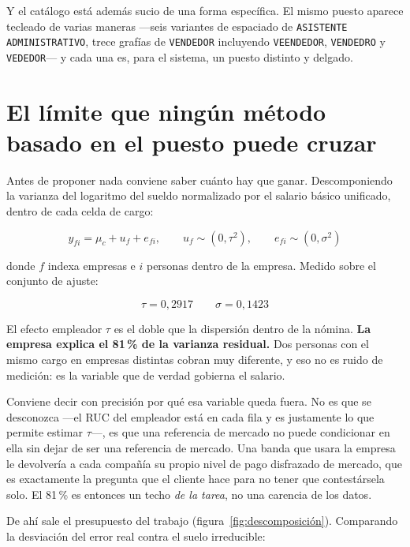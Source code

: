 \documentclass[12pt,a4paper]{report}
\newcommand{\cargo}[1]{\texttt{#1}}
\begin{document}
Y el catálogo está además sucio de una forma específica. El mismo puesto aparece
tecleado de varias maneras ---seis variantes de espaciado de \cargo{ASISTENTE
ADMINISTRATIVO}, trece grafías de \cargo{VENDEDOR} incluyendo \cargo{VEENDEDOR},
\cargo{VENDEDRO} y \cargo{VEDEDOR}--- y cada una es, para el sistema, un puesto
distinto y delgado.

\section{El límite que ningún método basado en el puesto puede cruzar}

Antes de proponer nada conviene saber cuánto hay que ganar. Descomponiendo la
varianza del logaritmo del sueldo normalizado por el salario básico unificado,
dentro de cada celda de cargo:

\begin{equation}
y_{fi} = \mu_c + u_f + e_{fi}, \qquad
u_f \sim (0, \tau^2), \qquad
e_{fi} \sim (0, \sigma^2)
\label{eq:modelo}
\end{equation}

donde $f$ indexa empresas e $i$ personas dentro de la empresa. Medido sobre el
conjunto de ajuste:

\[
\tau = 0{,}2917 \qquad \sigma = 0{,}1423
\]

El efecto empleador $\tau$ es el doble que la dispersión dentro de la nómina.
\textbf{La empresa explica el 81\,\% de la varianza residual.} Dos personas con
el mismo cargo en empresas distintas cobran muy diferente, y eso no es ruido de
medición: es la variable que de verdad gobierna el salario.

Conviene decir con precisión por qué esa variable queda fuera. No es que se
desconozca ---el RUC del empleador está en cada fila y es justamente lo que
permite estimar $\tau$---, es que una referencia de mercado no puede
condicionar en ella sin dejar de ser una referencia de mercado. Una banda que
usara la empresa le devolvería a cada compañía su propio nivel de pago
disfrazado de mercado, que es exactamente la pregunta que el cliente hace para
no tener que contestársela solo. El 81\,\% es entonces un techo \emph{de la
tarea}, no una carencia de los datos.

De ahí sale el presupuesto del trabajo (figura~\ref{fig:descomposición}). Comparando
la desviación del error real contra el suelo irreducible:
\end{document}
